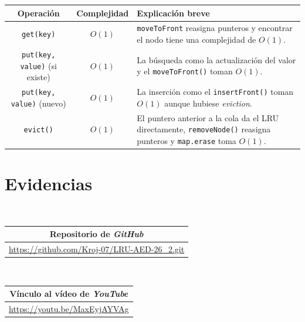 \documentclass[a4paper, table]{article}
\begin{document}
    \begin{table}[H]        
        \begin{tabular}{|c|c|p{5.5cm}|} 
            \hline \textbf{Operación} & \textbf{Complejidad} & \textbf{Explicación breve}\\
            \hline \texttt{get(key)} & $O(1)$ & \texttt{moveToFront} reasigna punteros y encontrar el nodo tiene una complejidad de $O(1)$. \\
            \hline \texttt{put(key, value)} (si existe) & $O(1)$ & La búsqueda como la actualización del valor y el \texttt{moveToFront()} toman $O(1)$. \\
            \hline \texttt{put(key, value)} (nuevo) & $O(1)$ & La inserción como el \texttt{insertFront()} toman $O(1)$ aunque hubiese \textit{eviction}. \\
            \hline \texttt{evict()} & $O(1)$ & El puntero anterior a la cola da el LRU directamente, \texttt{removeNode()} reasigna punteros y \texttt{map.erase} toma $O(1)$. \\ \hline
        \end{tabular}    
    \end{table}

\section{Evidencias}

\begin{table}[H]
        \centering
        
        \Large \\ [1em]
        
        \begin{tabular}{|c|} 
            \hline \textbf{Repositorio de \textit{GitHub}} \\
            \hline \url{https://github.com/Kroj-07/LRU-AED-26_2.git} \\ \hline
        \end{tabular}

            \\[1em]

        \begin{tabular}{|c|} 
            \hline \textbf{Vínculo al vídeo de \textit{YouTube}} \\
            \hline \url{https://youtu.be/MaxEyjAYVAg} \\ \hline
        \end{tabular}
    
    \end{table}
\end{document}
